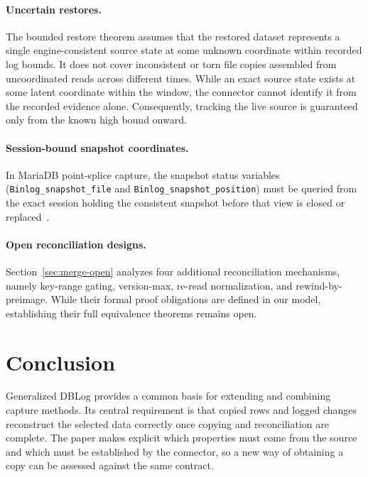\documentclass[sigconf,nonacm,10pt]{acmart}
\theoremstyle{plain}
\theoremstyle{definition}
\begin{document}
\paragraph{Uncertain restores.} The bounded restore theorem assumes that the restored 
dataset represents a single engine-consistent source state at some unknown coordinate 
within recorded log bounds. It does not cover inconsistent or torn file copies assembled 
from uncoordinated reads across different times. While an exact source state exists 
at some latent coordinate within the window, the connector cannot identify it from the 
recorded evidence alone. Consequently, tracking the live source is guaranteed only 
from the known high bound onward.

\paragraph{Session-bound snapshot coordinates.}
In MariaDB point-splice capture, the snapshot status variables
(\texttt{Binlog\_\allowbreak{}snapshot\_\allowbreak{}file} and
\texttt{Binlog\_\allowbreak{}snapshot\_\allowbreak{}position}) must be queried from the exact
session holding the consistent snapshot before that view is closed or
replaced~\cite{mariadb_binlog_status_vars,mariadb_snapshot_session_source}.

\paragraph{Open reconciliation designs.}
Section~\ref{sec:merge-open} analyzes four additional reconciliation mechanisms,
namely key-range gating, version-max, re-read normalization, and rewind-by-preimage.
While their formal proof obligations are defined in our model, establishing
their full equivalence theorems remains open.

\section{Conclusion}\label{sec:conclusion}

Generalized DBLog provides a common basis for extending and combining capture
methods. Its central requirement is that copied rows and logged changes
reconstruct the selected data correctly once copying and reconciliation are
complete. The paper makes explicit which properties must come from the source
and which must be established by the connector, so a new way of obtaining a
copy can be assessed against the same contract.
\end{document}
